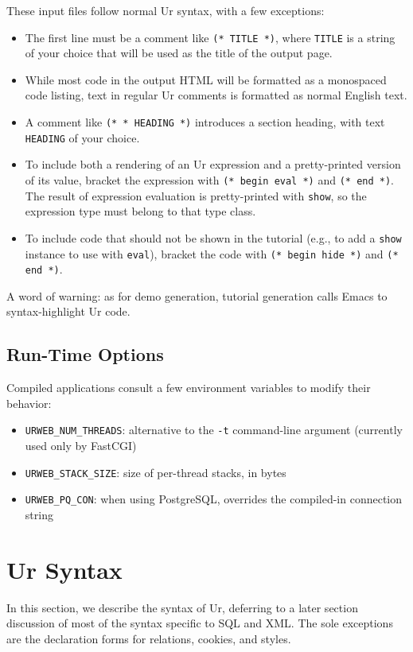 \documentclass{article}
\newcommand{\cd}[1]{\texttt{#1}}
\begin{document}
These input files follow normal Ur syntax, with a few exceptions:
\begin{itemize}
\item The first line must be a comment like \cd{(* TITLE *)}, where \cd{TITLE} is a string of your choice that will be used as the title of the output page.
\item While most code in the output HTML will be formatted as a monospaced code listing, text in regular Ur comments is formatted as normal English text.
\item A comment like \cd{(* * HEADING *)} introduces a section heading, with text \cd{HEADING} of your choice.
\item To include both a rendering of an Ur expression and a pretty-printed version of its value, bracket the expression with \cd{(* begin eval *)} and \cd{(* end *)}.  The result of expression evaluation is pretty-printed with \cd{show}, so the expression type must belong to that type class.
\item To include code that should not be shown in the tutorial (e.g., to add a \cd{show} instance to use with \cd{eval}), bracket the code with \cd{(* begin hide *)} and \cd{(* end *)}.
\end{itemize}

A word of warning: as for demo generation, tutorial generation calls Emacs to syntax-highlight Ur code.

\subsection{Run-Time Options}

Compiled applications consult a few environment variables to modify their behavior:

\begin{itemize}
  \item \cd{URWEB\_NUM\_THREADS}: alternative to the \cd{-t} command-line argument (currently used only by FastCGI)
  \item \cd{URWEB\_STACK\_SIZE}: size of per-thread stacks, in bytes
  \item \cd{URWEB\_PQ\_CON}: when using PostgreSQL, overrides the compiled-in connection string
\end{itemize}


\section{Ur Syntax}

In this section, we describe the syntax of Ur, deferring to a later section discussion of most of the syntax specific to SQL and XML.  The sole exceptions are the declaration forms for relations, cookies, and styles.
\end{document}
